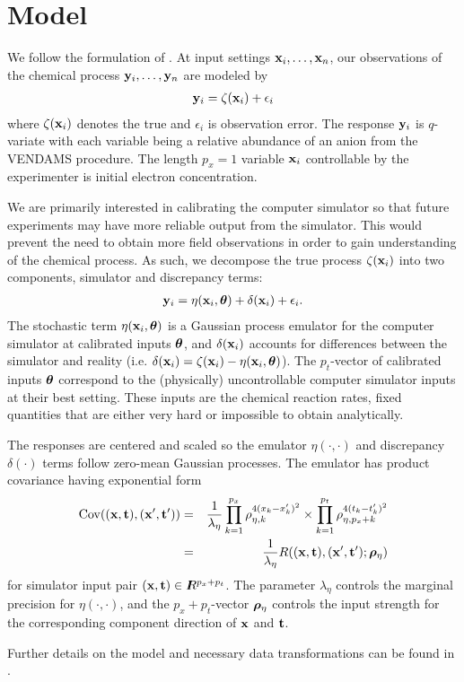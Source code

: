 \section{Model}

We follow the formulation of \cite{kennedy:2001}. At input settings $\mathbf{\bm{x}}_i,\ldots,\mathbf{\bm{x}}_n$, our observations of the chemical process $\mathbf{\bm{y}}_i,\ldots,\mathbf{\bm{y}}_n$ are modeled by
\begin{eqnarray}
\mathbf{\bm{y}}_i = \zeta(\mathbf{\bm{x}}_i) + \epsilon_i
\end{eqnarray}
where $\zeta(\mathbf{\bm{x}}_i)$ denotes the true and $\epsilon_i$ is observation error. The response $\mathbf{\bm{y}}_i$ is $q$-variate with each variable being a relative abundance of an anion from the VENDAMS procedure. The length $p_x=1$ variable $\mathbf{\bm{x}}_i$ controllable by the experimenter is initial electron concentration.

We are primarily interested in calibrating the computer simulator so that future experiments may have more reliable output from the simulator. This would prevent the need to obtain more field observations in order to gain understanding of the chemical process. As such, we decompose the true process $\zeta(\mathbf{\bm{x}}_i)$ into two components, simulator and discrepancy terms:
\begin{eqnarray}
\mathbf{\bm{y}}_i = \eta(\mathbf{\bm{x}}_i, \mathbf{\bm{\theta}}) + \delta(\mathbf{\bm{x}}_i) + \epsilon_i.
\end{eqnarray}
The stochastic term $\eta(\mathbf{\bm{x}}_i, \mathbf{\bm{\theta}})$ is a Gaussian process emulator for the computer simulator at calibrated inputs $\mathbf{\bm{\theta}}$, and $\delta(\mathbf{\bm{x}}_i)$ accounts for differences between the simulator and reality (i.e. $\delta(\mathbf{\bm{x}}_i) = \zeta(\mathbf{\bm{x}}_i) - \eta(\mathbf{\bm{x}}_i, \mathbf{\bm{\theta}})$). The $p_t$-vector of calibrated inputs $\mathbf{\bm{\theta}}$ correspond to the (physically) uncontrollable computer simulator inputs at their best setting. These inputs are the chemical reaction rates, fixed quantities that are either very hard or impossible to obtain analytically.

The responses are centered and scaled so the emulator $\eta(\cdot, \cdot)$ and discrepancy $\delta(\cdot)$ terms follow zero-mean Gaussian processes. The emulator has product covariance having exponential form
\begin{eqnarray}
\mathrm{Cov}((\mathbf{\bm{x}},\mathbf{\bm{t}}),(\mathbf{\bm{x}}',\mathbf{\bm{t}}')) &=& \frac{1}{\lambda_\eta}\prod_{k=1}^{p_x}\rho_{\eta,k}^{4(x_k-x_k')^2}\times\prod_{k=1}^{p_t}\rho_{\eta,p_x+k}^{4(t_k-t_k')^2} \\
&=& \frac{1}{\lambda_\eta}R((\mathbf{\bm{x}},\mathbf{\bm{t}}),(\mathbf{\bm{x}}',\mathbf{\bm{t}}'); \mathbf{\bm{\rho}}_\eta) 
\end{eqnarray}
for simulator input pair $(\mathbf{\bm{x}},\mathbf{\bm{t}})\in I\hspace{-4.4pt}R^{p_x+p_t}$. The parameter $\lambda_\eta$ controls the marginal precision for $\eta(\cdot, \cdot)$, and the $p_x+p_t$-vector $\mathbf{\bm{\rho}}_\eta$ controls the input strength for the corresponding component direction of $\mathbf{\bm{x}}$ and $\mathbf{\bm{t}}$.

Further details on the model and necessary data transformations can be found in \cite{higdon:2008}.
